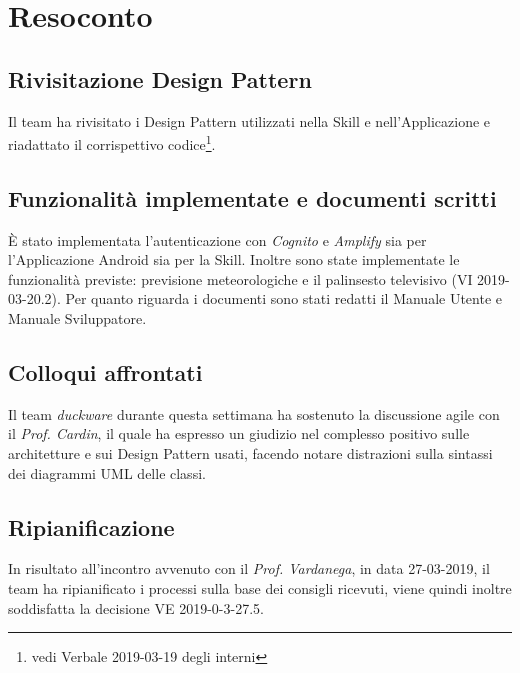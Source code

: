 \clearpage
\section{Resoconto}
	\subsection{Rivisitazione Design Pattern}
	\label{sec:pattern}
	Il team ha rivisitato i Design Pattern utilizzati nella Skill e nell'Applicazione e riadattato il corrispettivo codice\footnote{vedi Verbale 2019-03-19 degli interni}.
	\subsection{Funzionalità implementate e documenti scritti}
	\label{sec:funzionalità}
	È stato implementata l’autenticazione con \textit{Cognito} e \textit{Amplify} sia per l’Applicazione Android  sia per la Skill. Inoltre sono state implementate le funzionalità previste: previsione meteorologiche e il palinsesto televisivo (VI 2019-03-20.2). Per quanto riguarda i documenti sono stati redatti il Manuale Utente e Manuale Sviluppatore.
	\subsection{Colloqui affrontati}
	\label{sec:colloquio}
	Il team \textit{duckware} durante questa settimana ha sostenuto la discussione agile con il \textit{Prof. Cardin}, il quale ha espresso un giudizio nel complesso positivo sulle architetture e sui Design Pattern usati, facendo notare distrazioni sulla sintassi dei diagrammi UML delle classi.
	\subsection{Ripianificazione}
	\label{sec:ripianificazione}
	In risultato all'incontro avvenuto con il \textit{Prof. Vardanega}, in data 27-03-2019, il team ha ripianificato i processi sulla base dei consigli ricevuti, viene quindi inoltre soddisfatta la decisione VE 2019-0-3-27.5.
	 
	
	
	